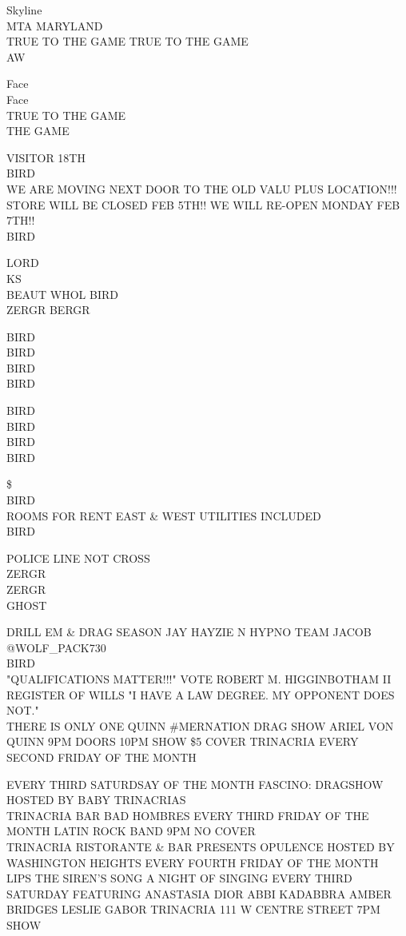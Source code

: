 \documentclass[10pt,letterpaper]{article}
\begin{document}
Skyline\\
MTA MARYLAND\\
TRUE TO THE GAME TRUE TO THE GAME\\
AW

Face\\
Face\\
TRUE TO THE GAME\\
THE GAME

VISITOR 18TH\\
BIRD\\
WE ARE MOVING NEXT DOOR TO THE OLD VALU PLUS LOCATION!!! STORE WILL BE CLOSED FEB 5TH!! WE WILL RE{-}OPEN MONDAY FEB 7TH!!\\
BIRD

LORD\\
KS\\
BEAUT WHOL BIRD\\
ZERGR BERGR

BIRD\\
BIRD\\
BIRD\\
BIRD

BIRD\\
BIRD\\
BIRD\\
BIRD

\$\\
BIRD\\
ROOMS FOR RENT EAST \& WEST UTILITIES INCLUDED\\
BIRD

POLICE LINE NOT CROSS\\
ZERGR\\
ZERGR\\
GHOST

DRILL EM \& DRAG SEASON JAY HAYZIE N HYPNO TEAM JACOB @WOLF\_PACK730\\
BIRD\\
"QUALIFICATIONS MATTER!!!" VOTE ROBERT M. HIGGINBOTHAM II REGISTER OF WILLS "I HAVE A LAW DEGREE.  MY OPPONENT DOES NOT."\\
THERE IS ONLY ONE QUINN \#MERNATION DRAG SHOW ARIEL VON QUINN 9PM DOORS 10PM SHOW \$5 COVER TRINACRIA EVERY SECOND FRIDAY OF THE MONTH

EVERY THIRD SATURDSAY OF THE MONTH FASCINO: DRAGSHOW HOSTED BY BABY TRINACRIAS\\
TRINACRIA BAR BAD HOMBRES EVERY THIRD FRIDAY OF THE MONTH LATIN ROCK BAND 9PM NO COVER\\
TRINACRIA RISTORANTE \& BAR PRESENTS OPULENCE HOSTED BY WASHINGTON HEIGHTS EVERY FOURTH FRIDAY OF THE MONTH\\
LIPS THE SIREN'S SONG A NIGHT OF SINGING EVERY THIRD SATURDAY FEATURING ANASTASIA DIOR ABBI KADABBRA AMBER BRIDGES LESLIE GABOR TRINACRIA 111 W CENTRE STREET 7PM SHOW
\end{document}

